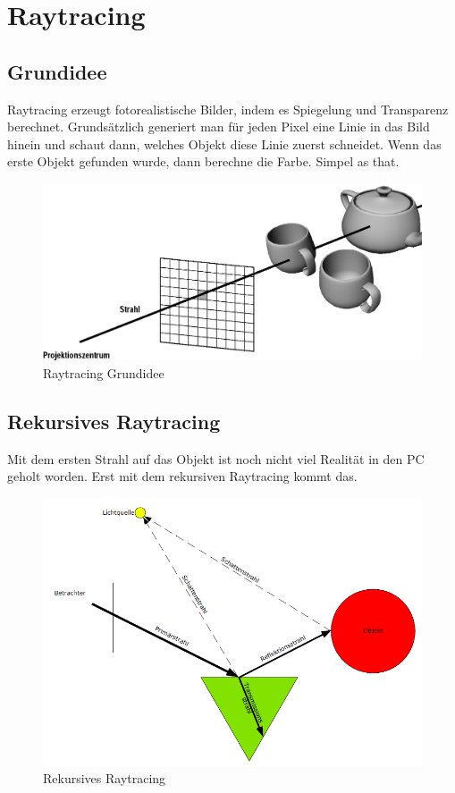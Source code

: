 \chapter{Raytracing}
\section{Grundidee}
Raytracing erzeugt fotorealistische Bilder, indem es Spiegelung und Transparenz berechnet. Grundsätzlich generiert man für jeden Pixel eine Linie in das Bild hinein und schaut dann, welches Objekt diese Linie zuerst schneidet. Wenn das erste Objekt gefunden wurde, dann berechne die Farbe. Simpel as that.
\begin{figure}[!ht]
	\centering
	\includegraphics[width=0.4\linewidth]{fig/raytracing}
	\caption{Raytracing Grundidee}
	\label{fig:raytracing}
\end{figure}

\section{Rekursives Raytracing}
Mit dem ersten Strahl auf das Objekt ist noch nicht viel Realität in den PC geholt worden. Erst mit dem rekursiven Raytracing kommt das.

\begin{figure}[!ht]
	\centering
	\includegraphics[width=0.5\linewidth]{fig/raytracing_rekursiv}
	\caption{Rekursives Raytracing}
	\label{fig:raytracing_rekursiv}
\end{figure}

